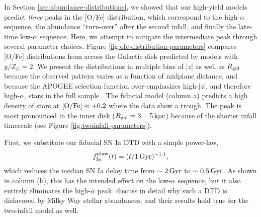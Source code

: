 \documentclass[twocolumn,twocolappendix,linenumbers]{aastex631}
\newcommand{\mathOFe}{{\rm [O/Fe]}}
\newcommand{\yZ}[1]{$y/Z_\odot=#1$}
\newcommand{\kpc}{\,{\rm kpc}}
\begin{document}
In Section \ref{sec:abundance-distributions}, we showed that our high-yield models predict {\it three} peaks in the [O/Fe] distribution, which correspond to the high-$\alpha$ sequence, the abundance ``turn-over'' after the second infall, and finally the late-time low-$\alpha$ sequence. Here, we attempt to mitigate the intermediate peak through several parameter choices.
Figure \ref{fig:ofe-distribution-parameters} compares [O/Fe] distributions from across the Galactic disk predicted by models with \yZ{2}. We present the distributions in multiple bins of $|z|$ as well as $R_{\rm gal}$ because the observed pattern varies as a function of midplane distance, and because the APOGEE selection function over-emphasizes high-$|z|$, and therefore high-$\alpha$, stars in the full sample \citep[see Figure 5 from][]{vincenzo_distribution_2021}. The fiducial model (column a) predicts a high density of stars at $\mathOFe\approx+0.2$ where the data show a trough. The peak is most pronounced in the inner disk ($R_{\rm gal}=3-5\kpc$) because of the shorter infall timescale (see Figure \ref{fig:twoinfall-parameters}).

First, we substitute our fiducial SN Ia DTD with a simple power-law,
\begin{equation}
    f_{\rm Ia}^{\rm plaw}(t) = (t/1\,\rm{Gyr})^{-1.1},
    \label{eq:powerlaw-dtd}
\end{equation}
which reduces the median SN Ia delay time from $\sim2\,{\rm Gyr}$ to $\sim0.5\,{\rm Gyr}$. As shown in column (b), this has the intended effect on the low-$\alpha$ sequence, but it also entirely eliminates the high-$\alpha$ peak. \citet{dubay_galactic_2024} discuss in detail why such a DTD is disfavored by Milky Way stellar abundances, and their results hold true for the two-infall model as well.
\end{document}
